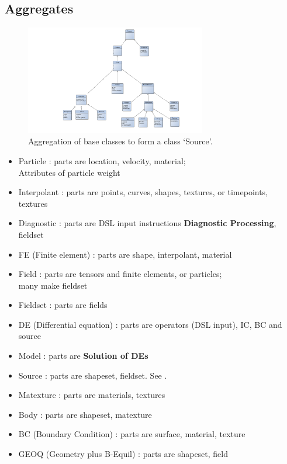 \subsection{Aggregates}\label{sec:aggregates}

\begin{figure}
\centerline{\includegraphics[width=0.7\textwidth]{./pics/aggregates.png}}
\caption{Aggregation of base classes to form a class `Source'.
\label{fig:aggregates}}
\end{figure}
\begin{itemize}
\item
  Particle : parts are location, velocity, material;\\
  Attributes of particle weight
\item
  Interpolant : parts are points, curves, shapes, textures, or
  timepoints, textures
\item
  Diagnostic : parts are DSL input instructions \textbf{Diagnostic
  Processing}, fieldset
\item
  FE (Finite element) : parts are shape, interpolant, material
\item
  Field : parts are tensors and finite elements, or particles;\\
  many make fieldset
\item
  Fieldset : parts are fields
\item
  DE (Differential equation) : parts are operators (DSL input), IC, BC
  and source
\item
  Model : parts are \textbf{Solution of DEs}
\item
  Source : parts are shapeset, fieldset. See .
\item
  Matexture : parts are materials, textures
\item
  Body : parts are shapeset, matexture
\item
  BC (Boundary Condition) : parts are surface, material, texture
\item
  GEOQ (Geometry plus B-Equil) : parts are shapeset, field
\end{itemize}


